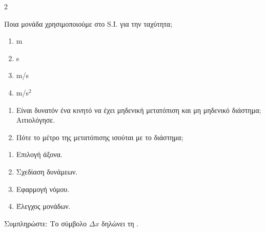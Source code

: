 \begin{multicols}{2}\RaggedRight\raggedcolumns
\begin{enumerate}[label=\arabic*.,leftmargin=13pt]
\end{enumerate}
Ποια μονάδα χρησιμοποιούμε στο S.I. για την ταχύτητα;
\begin{enumerate}[label=\BookGreek*),leftmargin=16pt]
\item \CheckSquare\hspace{1.1mm}m
\item \CheckSquare\hspace{1.1mm}s
\item \CheckSquare\hspace{1.1mm}m/s
\item \CheckSquare\hspace{1.1mm}m/s$^2$
\end{enumerate}
\columnbreak
{}
\begin{enumerate}[label=\arabic*.,leftmargin=13pt]
\item Είναι δυνατόν ένα κινητό να έχει μηδενική μετατόπιση και μη μηδενικό διάστημα; Αιτιολόγησε.
\item Πότε το μέτρο της μετατόπισης ισούται με το διάστημα;
\end{enumerate}
\begin{enumerate}[label=\roman*),leftmargin=15pt,itemsep=0pt]
\item Επιλογή άξονα.
\item Σχεδίαση δυνάμεων.
\item Εφαρμογή νόμου.
\item Έλεγχος μονάδων.
\end{enumerate}
Συμπληρώστε: Το σύμβολο \(\Delta x\) δηλώνει τη \underline{\hspace{15mm}}.
\end{multicols}
